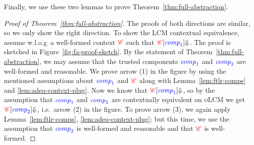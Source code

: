 \documentclass[acmsmall,screen]{acmart}\settopmatter{}
\renewcommand{\comp}{\var{comp}}
\newcommand{\trgcm}{\textsc{LCM}}
\newcommand{\srccm}{\textsc{oLCM}}
\begin{document}
Finally, we use these two lemmas to prove Theorem~\ref{thm:full-abstraction}.
\begin{proof}[Proof of Theorem~\ref{thm:full-abstraction}]
  The proofs of both directions are similar, so we only show the right direction.
  To show the \trgcm{} contextual equivalence, assume w.l.o.g\ a well-formed context ${\color{red} \mathscr{C}}$ such that ${\plug{\trg{\context}}{\src{\comp_1}} \term[]{}}$.
  The proof is sketched in Figure~\ref{fig:fa-proof-sketch}.
  By the statement of Theorem~\ref{thm:full-abstraction}, we may assume that the trusted components $\src{\comp_1}$ and $\src{\comp_2}$ are well-formed and reasonable.
  We prove arrow (1) in the figure by using the mentioned assumptions about $\src{\comp_1}$ and ${\color{red} \mathscr{C}}$ along with Lemma~\ref{lem:ftlr-comps} and \ref{lem:adeq-context-plug}.
  Now we know that ${\plug{\trg{\context}}{\src{\comp_1}} \sterm[]{}{}}$, so by the assumption that $\src{\comp_1}$ and $\src{\comp_2}$ are contextually equivalent on \srccm{} we get ${\plug{\trg{\context}}{\src{\comp_2}} \sterm[]{}{}}$, i.e.\ arrow (2) in the figure.
  To prove arrow (3), we again apply Lemma~\ref{lem:ftlr-comps}, \ref{lem:adeq-context-plug}; but this time, we use the assumption that $\src{\comp_2}$ is well-formed and reasonable and that ${\color{red} \mathscr{C}}$ is well-formed.
\end{proof}
\end{document}
